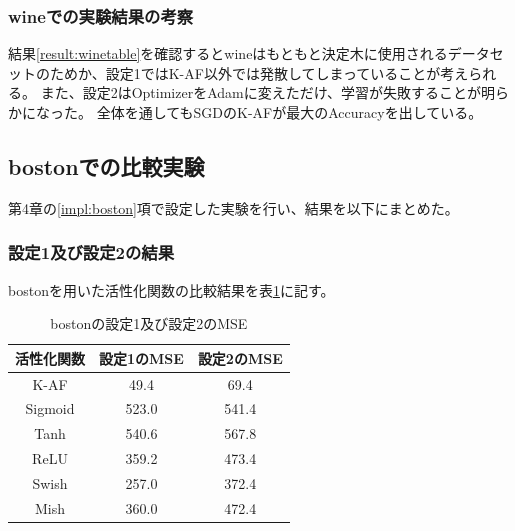 \subsubsection{wineでの実験結果の考察}
結果\ref{result:winetable}を確認するとwineはもともと決定木に使用されるデータセットのためか、設定1ではK-AF以外では発散してしまっていることが考えられる。
また、設定2はOptimizerをAdamに変えただけ、学習が失敗することが明らかになった。
全体を通してもSGDのK-AFが最大のAccuracyを出している。







\subsection{bostonでの比較実験}
\label{ev:bostonでの比較実験}

第4章の\ref{impl:boston}項で設定した実験を行い、結果を以下にまとめた。
\subsubsection{設定1及び設定2の結果}

bostonを用いた活性化関数の比較結果を表\ref{result:bostontable}に記す。


\begin{table}[htbp]
    \begin{center}
        \caption{bostonの設定1及び設定2のMSE}
        \label{result:bostontable}
        \vspace{2mm} 
        \begin{tabular}{|c|c|c|}
            \hline
            活性化関数              & 設定1のMSE &  設定2のMSE \\
            \hline
            K-AF            & 49.4 & 69.4 \\
            \hline
            Sigmoid            & 523.0 & 541.4 \\
            \hline
            Tanh            & 540.6 &  567.8 \\
            \hline
            ReLU        & 359.2 & 473.4 \\
            \hline
            Swish           & 257.0 & 372.4 \\
            \hline
            Mish           & 360.0 & 472.4 \\
            \hline
    
        \end{tabular}
    \end{center}
\end{table}


